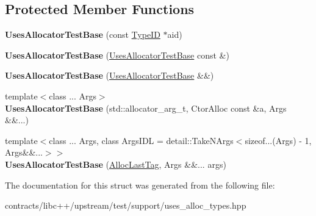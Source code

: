 \subsection*{Protected Member Functions}
\begin{DoxyCompactItemize}
\item 
\mbox{\label{struct_uses_allocator_test_base_a54d82ab73f9e54550e4e408cc7490c95}} 
{\bfseries Uses\+Allocator\+Test\+Base} (const \mbox{\hyperlink{struct_type_i_d}{Type\+ID}} $\ast$aid)
\item 
\mbox{\label{struct_uses_allocator_test_base_a7d3c7756d1cea462e6bad3726ad7042c}} 
{\bfseries Uses\+Allocator\+Test\+Base} (\mbox{\hyperlink{struct_uses_allocator_test_base}{Uses\+Allocator\+Test\+Base}} const \&)
\item 
\mbox{\label{struct_uses_allocator_test_base_a3abc6379f7fe419e44c8df453f32740b}} 
{\bfseries Uses\+Allocator\+Test\+Base} (\mbox{\hyperlink{struct_uses_allocator_test_base}{Uses\+Allocator\+Test\+Base}} \&\&)
\item 
\mbox{\label{struct_uses_allocator_test_base_a77b81886750afa1378a4797e43ad07b8}} 
{\footnotesize template$<$class ... Args$>$ }\\{\bfseries Uses\+Allocator\+Test\+Base} (std\+::allocator\+\_\+arg\+\_\+t, Ctor\+Alloc const \&a, Args \&\&...)
\item 
\mbox{\label{struct_uses_allocator_test_base_a2f7a2c2369442885b6fba085a4d22e40}} 
{\footnotesize template$<$class ... Args, class Args\+I\+DL  = detail\+::\+Take\+N\+Args$<$sizeof...(\+Args) -\/ 1, Args\&\&...$>$$>$ }\\{\bfseries Uses\+Allocator\+Test\+Base} (\mbox{\hyperlink{struct_alloc_last_tag}{Alloc\+Last\+Tag}}, Args \&\&... args)
\end{DoxyCompactItemize}


The documentation for this struct was generated from the following file\+:\begin{DoxyCompactItemize}
\item 
contracts/libc++/upstream/test/support/uses\+\_\+alloc\+\_\+types.\+hpp\end{DoxyCompactItemize}
